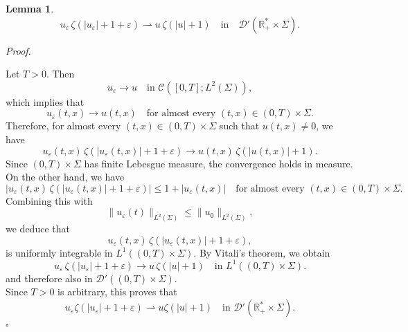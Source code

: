 \documentclass[10pt]{article}
\newtheorem{lemma}[theorem]{Lemma}
\renewenvironment{proof}[1][Proof]{%
  \noindent\textit{#1. }%
}{\hfill$\square$\vspace{4pt}}
\begin{document}
\begin{lemma}\label{cv11}
$$
u_\varepsilon \, \zeta(|u_\varepsilon|+1+\varepsilon) \rightharpoonup u \, \zeta(|u|+1) \quad \text{in} \quad \mathcal{D}'(\mathbb{R}_+^*\times \Sigma).
$$
\end{lemma}

\begin{proof}
Let $T>0$. Then
\[
u_\varepsilon \to u
\quad \text{in } \mathcal{C}([0,T]; L^2(\Sigma)),
\]
which implies that
\[
u_\varepsilon(t,x) \to u(t,x)
\quad \text{for almost every } (t,x) \in (0,T)\times \Sigma.
\]
Therefore, for almost every $ (t,x) \in (0,T) \times \Sigma $ such that
$ u(t,x) \neq 0 $, we have
\[
u_\varepsilon(t,x) \, \zeta(|u_\varepsilon(t,x)| + 1 + \varepsilon)
\longrightarrow
u(t,x) \, \zeta(|u(t,x)| + 1).
\]
Since $(0,T)\times\Sigma$ has finite Lebesgue measure, the convergence holds in measure. On the other hand, we have
\[
\big| u_\varepsilon(t,x)\, \zeta(|u_\varepsilon(t,x)| + 1 + \varepsilon) \big|
\le 1 + |u_\varepsilon(t,x)|
\quad \text{for almost every } (t,x)\in (0,T)\times\Sigma.
\]
Combining this with
\[
\|u_\varepsilon(t)\|_{L^2(\Sigma)} \le \|u_0\|_{L^2(\Sigma)},
\]
we deduce that 
\[
u_\varepsilon(t,x)\, \zeta(|u_\varepsilon(t,x)| + 1 + \varepsilon),
\]
is uniformly integrable in $L^1((0,T)\times\Sigma)$.
By Vitali's theorem, we obtain
\[
u_\varepsilon \, \zeta(|u_\varepsilon| + 1 + \varepsilon)
\longrightarrow
u \, \zeta(|u| + 1)
\quad \text{in } L^1((0,T)\times \Sigma).
\]
and therefore also in $\mathcal D'((0,T)\times \Sigma)$.
\\
Since $T>0$ is arbitrary, this proves that
\[
u_\varepsilon \zeta(|u_\varepsilon| + 1 + \varepsilon) \rightharpoonup u \zeta(|u| + 1) \quad \text{in } \mathcal D'(\mathbb{R}_+^*\times \Sigma).
\]
\end{proof}
\end{document}

